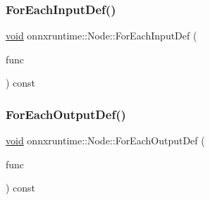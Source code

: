 \subsubsection{\texorpdfstring{For\+Each\+Input\+Def()}{ForEachInputDef()}}
{\footnotesize\ttfamily \mbox{\hyperlink{mlasi_8h_a88f941d423cb2a819b70a1358982b1a6}{void}} onnxruntime\+::\+Node\+::\+For\+Each\+Input\+Def (\begin{DoxyParamCaption}\item[{std\+::function$<$ \mbox{\hyperlink{mlasi_8h_a88f941d423cb2a819b70a1358982b1a6}{void}}(const \mbox{\hyperlink{classonnxruntime_1_1NodeArg}{onnxruntime\+::\+Node\+Arg}} $\ast$)$>$}]{func }\end{DoxyParamCaption}) const}

\mbox{\label{classonnxruntime_1_1Node_a28fd0150c29bb6c31b863ea8fd8f456b}} 
\subsubsection{\texorpdfstring{For\+Each\+Output\+Def()}{ForEachOutputDef()}}
{\footnotesize\ttfamily \mbox{\hyperlink{mlasi_8h_a88f941d423cb2a819b70a1358982b1a6}{void}} onnxruntime\+::\+Node\+::\+For\+Each\+Output\+Def (\begin{DoxyParamCaption}\item[{std\+::function$<$ \mbox{\hyperlink{mlasi_8h_a88f941d423cb2a819b70a1358982b1a6}{void}}(const \mbox{\hyperlink{classonnxruntime_1_1NodeArg}{onnxruntime\+::\+Node\+Arg}} $\ast$)$>$}]{func }\end{DoxyParamCaption}) const}

\mbox{\label{classonnxruntime_1_1Node_a98a99b6bf75b766f90f0b0ec26597aaa}} 
